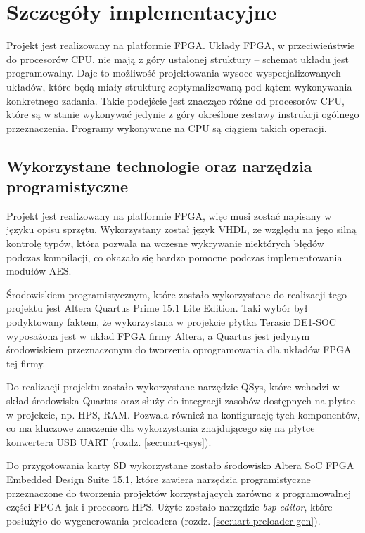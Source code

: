 \section{Szczegóły implementacyjne}
\label{sec:szczegoly-implementacyjne}
Projekt jest realizowany na platformie FPGA. Układy FPGA, w przeciwieństwie do procesorów CPU, nie mają z góry ustalonej struktury -- schemat układu jest programowalny. Daje to możliwość projektowania wysoce wyspecjalizowanych układów, które będą miały strukturę zoptymalizowaną pod kątem wykonywania konkretnego zadania. Takie podejście jest znacząco różne od procesorów CPU, które są w stanie wykonywać jedynie z góry określone zestawy instrukcji ogólnego przeznaczenia. Programy wykonywane na CPU są ciągiem takich operacji.

\subsection{Wykorzystane technologie oraz narzędzia programistyczne}
Projekt jest realizowany na platformie FPGA, więc musi zostać napisany w języku opisu sprzętu. Wykorzystany został język VHDL, ze względu na jego silną kontrolę typów, która pozwala na wczesne wykrywanie niektórych błędów podczas kompilacji, co okazało się bardzo pomocne podczas implementowania modułów AES.

Środowiskiem programistycznym, które zostało wykorzystane do realizacji tego projektu jest Altera Quartus Prime 15.1 Lite Edition. Taki wybór był podyktowany faktem, że wykorzystana w projekcie płytka Terasic DE1-SOC wyposażona jest w układ FPGA firmy Altera, a Quartus jest jedynym środowiskiem przeznaczonym do tworzenia oprogramowania dla układów FPGA tej firmy.

Do realizacji projektu zostało wykorzystane narzędzie QSys, które wchodzi w skład środowiska Quartus oraz służy do integracji zasobów dostępnych na płytce w projekcie, np. HPS, RAM. Pozwala również na konfigurację tych komponentów, co ma kluczowe znaczenie dla wykorzystania znajdującego się na płytce konwertera USB UART (rozdz. \ref{sec:uart-qsys}).

Do przygotowania karty SD wykorzystane zostało środowisko Altera SoC FPGA Embedded Design Suite 15.1, które zawiera narzędzia programistyczne przeznaczone do tworzenia projektów korzystających zarówno z programowalnej części FPGA jak i procesora HPS. Użyte zostało narzędzie \textit{bsp-editor}, które posłużyło do wygenerowania preloadera (rozdz. \ref{sec:uart-preloader-gen}).

